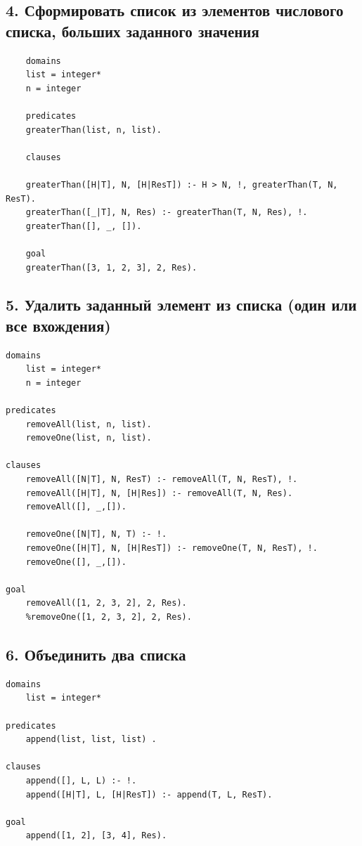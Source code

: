 \documentclass[12pt]{report}
\begin{document}
\subsection*{4. Сформировать список из элементов числового списка, больших заданного значения}
\begin{lstlisting}	
	domains
	list = integer*
	n = integer
	
	predicates
	greaterThan(list, n, list).
	
	clauses
	
	greaterThan([H|T], N, [H|ResT]) :- H > N, !, greaterThan(T, N, ResT).
	greaterThan([_|T], N, Res) :- greaterThan(T, N, Res), !.
	greaterThan([], _, []).
	
	goal
	greaterThan([3, 1, 2, 3], 2, Res). 
\end{lstlisting}

\subsection*{5. Удалить заданный элемент из списка (один или все вхождения)}
\begin{lstlisting}	
domains
	list = integer*
	n = integer
	
predicates
	removeAll(list, n, list).
	removeOne(list, n, list).

clauses
	removeAll([N|T], N, ResT) :- removeAll(T, N, ResT), !.
	removeAll([H|T], N, [H|Res]) :- removeAll(T, N, Res).
	removeAll([], _,[]).

	removeOne([N|T], N, T) :- !.
	removeOne([H|T], N, [H|ResT]) :- removeOne(T, N, ResT), !.
	removeOne([], _,[]).

goal
	removeAll([1, 2, 3, 2], 2, Res).
	%removeOne([1, 2, 3, 2], 2, Res).
\end{lstlisting}
\clearpage
\subsection*{6. Объединить два списка}
\begin{lstlisting}	
domains
	list = integer*

predicates
	append(list, list, list) .
	
clauses
	append([], L, L) :- !.
	append([H|T], L, [H|ResT]) :- append(T, L, ResT).

goal
	append([1, 2], [3, 4], Res).
\end{lstlisting}
	
	
\end{document}
